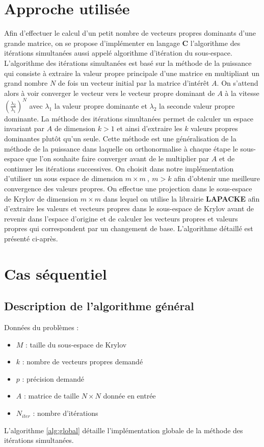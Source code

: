\documentclass[11pt,a4paper]{article}
\begin{document}
\section{Approche utilisée}
	Afin d'effectuer le calcul d'un petit nombre de vecteurs propres dominants d'une grande matrice, on se propose d'implémenter en langage \textbf{C} l'algorithme des itérations simultanées aussi appelé algorithme d'itération du sous-espace.
	L'algorithme des itérations simultanées est basé sur la méthode de la puissance qui consiste à extraire la valeur propre principale d'une matrice en multipliant un grand nombre $N$ de fois un vecteur initial par la matrice d'intérêt $A$. On s'attend alors à voir converger le vecteur vers le vecteur propre dominant de $A$ à la vitesse $\left(\frac{\lambda_2}{\lambda_1}\right)^N$ avec $\lambda_1$ la valeur propre dominante et $\lambda_2$ la seconde valeur propre dominante.
	La méthode des itérations simultanées permet de calculer un espace invariant par $A$ de dimension $k > 1$ et ainsi d'extraire les $k$ valeurs propres dominantes plutôt qu'un seule. Cette méthode est une généralisation de la méthode de la puissance dans laquelle on orthonormalise à chaque étape le sous-espace que l'on souhaite faire converger avant de le multiplier par $A$ et de continuer les itérations successives. On choisit dans notre implémentation d'utiliser un sous espace de dimension $m\times m\:,\: m > k$ afin d'obtenir une meilleure convergence des valeurs propres. On effectue une projection dans le sous-espace de Krylov de dimension $m\times m$ dans lequel on utilise la librairie \textbf{LAPACKE} afin d'extraire les valeurs et vecteurs propres dans le sous-espace de Krylov avant de revenir dans l'espace d'origine et de calculer les vecteurs propres et valeurs propres qui correspondent par un changement de base. L'algorithme détaillé est présenté ci-après.

\section{Cas séquentiel}

	\subsection{Description de l'algorithme général}

		Données du problèmes :

		\begin{itemize}
			\item $M$ : taille du sous-espace de Krylov
			\item $k$ : nombre de vecteurs propres demandé
			\item $p$ : précision demandé
			\item $A$ : matrice de taille $N\times N$ donnée en entrée
			\item $N_{iter}$ : nombre d'itérations
		\end{itemize}
		\vspace{1cm}
		L'algorithme \ref{alg:global} détaille l'implémentation globale de la méthode des itérations simultanées.
\end{document}
